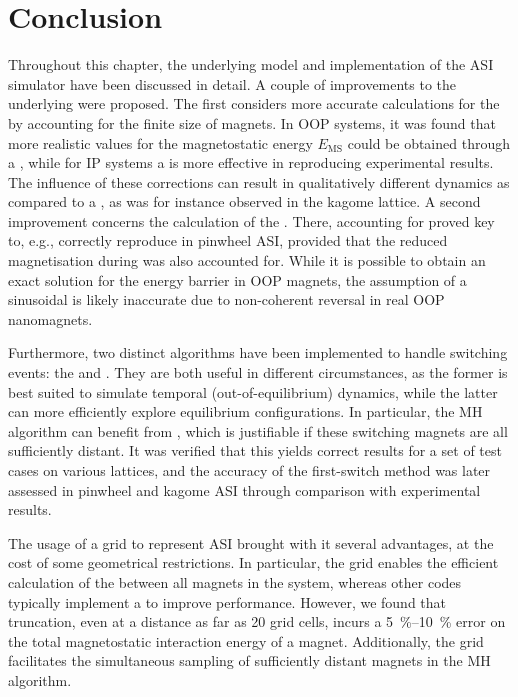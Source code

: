 \newpage
\section{Conclusion}
Throughout this chapter, the underlying model and implementation of the \hotspice ASI simulator have been discussed in detail.
A couple of improvements to the underlying  were proposed.
The first considers more accurate calculations for the  by accounting for the finite size of magnets.
In OOP systems, it was found that more realistic values for the magnetostatic energy $E_\mathrm{MS}$ could be obtained through a , while for IP systems a  is more effective in reproducing experimental results.
The influence of these corrections can result in qualitatively different dynamics as compared to a , as was for instance observed in the kagome lattice.
A second improvement concerns the calculation of the .
There, accounting for  proved key to, e.g., correctly reproduce  in pinwheel ASI, provided that the reduced magnetisation during  was also accounted for.
While it is possible to obtain an exact solution for the energy barrier in OOP magnets, the assumption of a sinusoidal  is likely inaccurate due to non-coherent reversal in real OOP nanomagnets. \\\par
Furthermore, two distinct algorithms have been implemented to handle switching events: the  and .
They are both useful in different circumstances, as the former is best suited to simulate temporal (out-of-equilibrium) dynamics, while the latter can more efficiently explore equilibrium configurations.
In particular, the MH algorithm can benefit from , which is justifiable if these switching magnets are all sufficiently distant.
It was verified that this yields correct results for a set of test cases on various lattices, and the accuracy of the first-switch method was later assessed in pinwheel and kagome ASI through comparison with experimental results. \\\par
The usage of a grid to represent ASI brought with it several advantages, at the cost of some geometrical restrictions.
In particular, the grid enables the efficient calculation of the  between all magnets in the system, whereas other codes typically implement a  to improve performance.
However, we found that truncation, even at a distance as far as 20 grid cells, incurs a \SIrange{5}{10}{\percent} error on the total magnetostatic interaction energy of a magnet.
Additionally, the grid facilitates the simultaneous sampling of sufficiently distant magnets in the MH algorithm. \\\par

